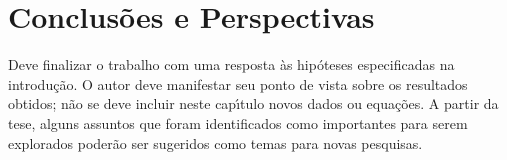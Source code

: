 
\chapter{Conclus\~oes e Perspectivas}\label{cap:conclusoeseperspectivas}

Deve finalizar o trabalho com uma resposta \`as hip\'oteses especificadas na introdu\c{c}\~ao. O autor deve manifestar seu ponto de vista sobre os resultados obtidos; n\~ao se deve incluir neste cap\'{\i}tulo novos dados ou equa\c{c}\~oes. A partir da tese, alguns assuntos que foram identificados como importantes para serem explorados poder\~ao ser sugeridos como temas para novas pesquisas.
